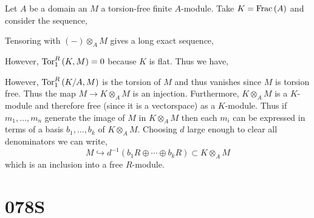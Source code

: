 \documentclass[12pt]{article}
\begin{document}
Let $A$ be a domain an $M$ a torsion-free finite $A$-module. Take $K = \mathrm{Frac}\left(A\right)$ and consider the sequence,
\begin{center}
\end{center}
Tensoring with $(-) \otimes_A M$ gives a long exact sequence,
\begin{center}
\end{center}
However, $\mathrm{Tor}^{R}_{1} \left( K, M \right) = 0$ because $K$ is flat. Thus we have,
\begin{center}
\end{center}
However, $\mathrm{Tor}^{R}_{1} \left( K/A, M \right)$ is the torsion of $M$ and thus vanishes since $M$ is torsion free. Thus the map $M \to K \otimes_A M$ is an injection. Furthermore, $K \otimes_A M$ is a $K$-module and therefore free (since it is a vectorspace) as a $K$-module. Thus if $m_1, \dots, m_n$ generate the image of $M$ in $K \otimes_A M$ then each $m_i$ can be expressed in terms of a basis $b_1, \dots, b_k$ of $K \otimes_A M$. Choosing $d$ large enough to clear all denominators we can write,
\[ M \hookrightarrow d^{-1} (b_1 R \oplus \cdots \oplus b_k R)  \subset K \otimes_A M \] 
which is an inclusion into a free $R$-module.  
\section{078S}
\end{document}
